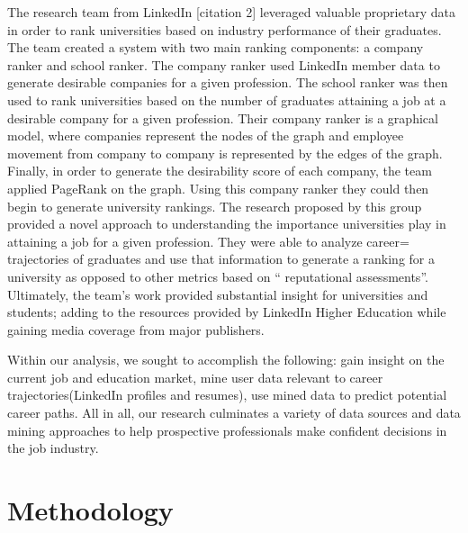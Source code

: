 The research team from LinkedIn [citation 2] leveraged valuable proprietary data in order to rank universities based on industry performance of their graduates. The team created a system with two main ranking components: a company ranker and school ranker. The company ranker used LinkedIn member data to generate desirable companies for a given profession. The school ranker was then used to rank universities based on the number of graduates attaining a job at a desirable company for a given profession. Their company ranker is a graphical model, where companies represent the nodes of the graph and employee movement from company to company is represented by the edges of the graph. Finally, in order to generate the desirability score of each company, the team applied PageRank on the graph. Using this company ranker they could then begin to generate university rankings. The research proposed by this group provided a novel approach to understanding the importance universities play in attaining a job for a given profession. They were able to analyze career= trajectories of graduates and use that information to generate a ranking for a university as opposed to other metrics based on “ reputational assessments”. Ultimately, the team’s work provided substantial insight for universities and students; adding to the resources provided by LinkedIn Higher Education while gaining media coverage from major publishers.

Within our analysis, we sought to accomplish the following: gain insight on the current job and education market, mine user data relevant to career trajectories(LinkedIn profiles and resumes), use mined data to predict potential career paths. All in all, our research culminates a variety of data sources and data mining approaches to help prospective professionals make confident decisions in the job industry. 
\section{Methodology}
